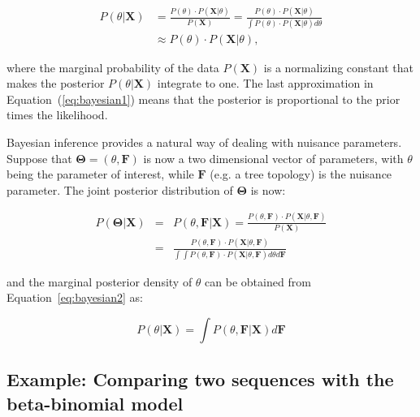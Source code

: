 \begin{align}
P\left(\theta|\mathbf{X}\right) &= \frac{P(\theta)\cdot P\left(\mathbf{X}|\theta\right)}{P\left(\mathbf{X}\right)}=\frac{P(\theta)\cdot P\left(\mathbf{X}|\theta\right)}{\int P(\theta)\cdot P\left(\mathbf{X}|\theta\right)d\theta}  \nonumber \\
& \approx  P(\theta)\cdot P\left(\mathbf{X}|\theta\right),
\label{eq:bayesian1}
\end{align}

\noindent
where the marginal probability of the data $P\left(\mathbf{X}\right)$ is a normalizing constant that makes the posterior $P\left(\theta|\mathbf{X}\right)$ integrate to one.
The last approximation in Equation~(\ref{eq:bayesian1}) means that the posterior is proportional to the prior times the likelihood.

Bayesian inference provides a natural way of dealing with nuisance parameters.
Suppose that $\mathbf{\Theta}=\left(\theta,\mathbf{F}\right)$ is now a two dimensional vector of parameters, with $\theta$ being the parameter of interest, while 
$\mathbf{F}$ (e.g. a tree topology) is the nuisance parameter.
The joint posterior distribution of $\mathbf{\Theta}$ is now:

\begin{eqnarray}
P\left(\mathbf{\Theta}|\mathbf{X}\right) &=& P\left(\theta,\mathbf{F}|\mathbf{X}\right)=\frac{P\left(\theta,\mathbf{F}\right)\cdot P\left(\mathbf{X}|\theta,\mathbf{F}\right)}{P\left(\mathbf{X}\right)}  \nonumber \\
&=& \frac{P\left(\theta,\mathbf{F}\right)\cdot P\left(\mathbf{X}|\theta,\mathbf{F}\right)}{\int\int P(\theta,\mathbf{F})\cdot P\left(\mathbf{X}|\theta,\mathbf{F}\right)d\theta d\mathbf{F}}
\label{eq:bayesian2}
\end{eqnarray}

\noindent
and the marginal posterior density of $\theta$ can be obtained from Equation~\ref{eq:bayesian2} as:

\begin{equation}
P\left(\theta|\mathbf{X}\right) =\int P\left(\theta,\mathbf{F}|\mathbf{X}\right)d\mathbf{F}
\label{eq:bayesian3}
\end{equation}

\subsection{Example: Comparing two sequences with the beta-binomial model\label{sub:ex_beta_binom}}

